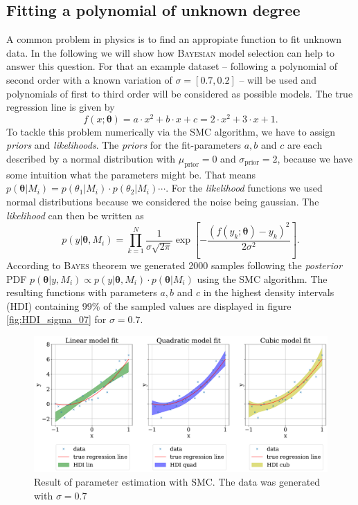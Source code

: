 \documentclass[%
 reprint,
 amsmath,amssymb,
 aps,
]{revtex4-1}
\newcommand{\btheta}{\boldsymbol{\theta}}
\begin{document}
\subsection{Fitting a polynomial of unknown degree}\label{sec:poly}
\noindent A common problem in physics is to find an appropiate function to fit unknown data. In the following we will show how \textsc{Bayesian} model selection can help to answer this question. For that an example dataset -- following a polynomial of second order with a known variation of $\sigma=[0.7, 0.2]$ -- will be used and polynomials of first to third order will be considered as possible models. 
The true regression line is given by
\begin{equation*}
	f(x;\btheta)=a\cdot x^2+b\cdot x+c=2\cdot x^2+3\cdot x+1.
\end{equation*}
To tackle this problem numerically via the SMC algorithm, we have to assign \emph{priors} and \emph{likelihoods}. The \emph{priors} for the fit-parameters $a,b$ and $c$  are each described by a normal distribution with $\mu_{\text{prior}}=0$ and $\sigma_{\text{prior}}=2$, because we have some intuition what the parameters might be. That means $p(\btheta|M_i)=p(\theta_1|M_i)\cdot p(\theta_2|M_i)\cdots $. For the \emph{likelihood} functions we used normal distributions because we considered the noise being gaussian. The \emph{likelihood} can then be written as \cite[Chap. 3]{sivia}
$$p(y|\btheta, M_i)=\prod_{k=1}^{N}\frac{1}{\sigma\sqrt{2\pi}}\exp{\left[-\frac{(f(y_k;\btheta)-y_k)^2}{2\sigma^2}\right]}.$$
According to \textsc{Bayes} theorem we generated 2000 samples following the \emph{posterior} PDF $p(\btheta|y,M_i)\propto p(y|\btheta, M_i)\cdot p(\btheta|M_i) $ using the SMC algorithm. The resulting functions with parameters $a,b$ and $c$ in the highest density intervals (HDI) containing 99\% of the sampled values are displayed in figure \eqref{fig:HDI_sigma_07} for $\sigma=0.7$.
\begin{figure}
	\includegraphics[width=\textwidth]{HDI_sigma_07}
	\caption{Result of parameter estimation with SMC. The data was generated with $\sigma=0.7$}\label{fig:HDI_sigma_07}
\end{figure}
\end{document}

